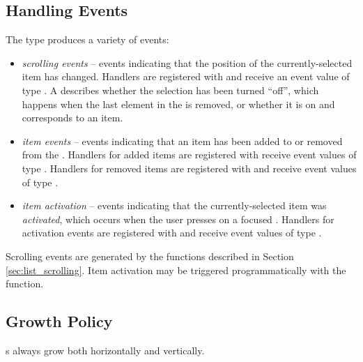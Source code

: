 \subsection{Handling Events}

The  type produces a variety of events:

\begin{itemize}
\item \textit{scrolling events} -- events indicating that the position
  of the currently-selected item has changed.  Handlers are registered
  with  and receive an event value of type
  .  A  describes whether the
  selection has been turned ``off'', which happens when the last
  element in the  is removed, or whether it is on and
  corresponds to an item.
\item \textit{item events} -- events indicating that an item has been
  added to or removed from the .  Handlers for added items
  are registered with  receive event values of type
  .  Handlers for removed items are registered with
   and receive event values of type
  .
\item \textit{item activation} -- events indicating that the
  currently-selected item was \textit{activated}, which occurs when
  the user presses  on a focused .  Handlers for
  activation events are registered with  and
  receive event values of type .
\end{itemize}

Scrolling events are generated by the functions described in Section
\ref{sec:list_scrolling}.  Item activation may be triggered
programmatically with the  function.

\subsection{Growth Policy}

s always grow both horizontally and vertically.

